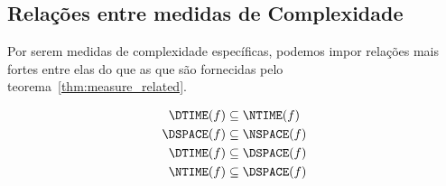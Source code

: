 \subsection{Relações entre medidas de Complexidade}
\label{sec:relations_between_measures}

Por serem medidas de complexidade específicas,
podemos impor relações mais fortes entre elas
do que as que são fornecidas pelo teorema~\ref{thm:measure_related}.

\begin{proposition}
    \begin{align}
        \DTIME(f) &\subseteq \NTIME(f) \label{eq:dtime_in_time} \\
        \DSPACE(f) &\subseteq \NSPACE(f) \label{eq:dspace_in_nspace} \\
        \DTIME(f) &\subseteq \DSPACE(f) \label{eq:dtime_in_dspace} \\
        \NTIME(f) &\subseteq \DSPACE(f) \label{eq:ntime_in_dspace}
    \end{align}
\end{proposition}
